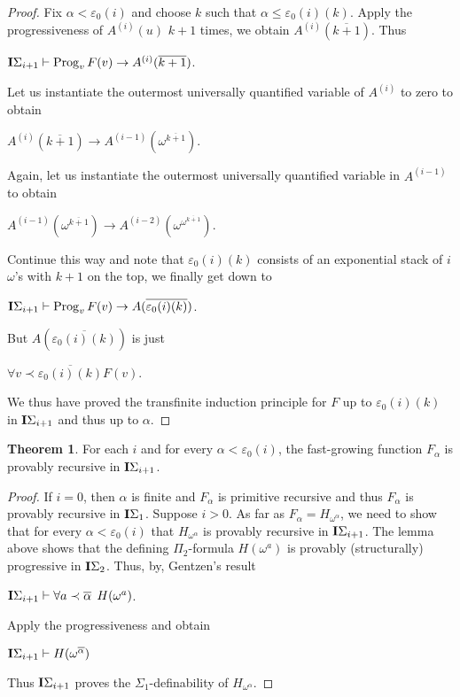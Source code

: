 \documentclass[8pt]{article}
\theoremstyle{definition}
\theoremstyle{definition}
\newtheorem{theorem}{Theorem}[section]
\theoremstyle{definition}
\theoremstyle{definition}
\theoremstyle{definition}
\theoremstyle{definition}
\theoremstyle{definition}
\theoremstyle{definition}
\theoremstyle{definition}
\theoremstyle{definition}
\theoremstyle{definition}
\theoremstyle{definition}
\theoremstyle{definition}
\theoremstyle{question}
\begin{document}
\begin{proof}
  Fix $\alpha < \varepsilon_0(i)$ and choose $k$ such that $\alpha \leq \varepsilon_0(i)(k)$. Apply the progressiveness
  of $A^{(i)}(u)$ $k + 1$ times, we obtain $A^{(i)}(\overline{k + 1})$. Thus
  \begin{center}
    ${\bf I}\Sigma_{i + 1} \vdash \operatorname{Prog}_v F(v) \to A^{(i)} (\overline{k + 1})$.
  \end{center}
  Let us instantiate the outermost universally quantified variable of $A^{(i)}$ to zero to obtain
  \begin{center}
  $A^{(i)}(\overline{k + 1}) \to A^{(i - 1)}(\omega^{\overline{ k + 1}})$.
  \end{center}
  Again, let us instantiate the outermost universally quantified variable in $A^{(i - 1)}$ to obtain
  \begin{center}
    $A^{(i - 1)}(\omega^{\overline{k + 1}}) \to A^{(i - 2)}(\omega^{\omega^{\overline{k + 1}}})$.
  \end{center}
  Continue this way and note that $\varepsilon_0(i)(k)$ consists of an exponential stack of $i$ $\omega$'s
  with $k + 1$ on the top, we finally get down to
  \begin{center}
    ${\bf I}\Sigma_{i + 1} \vdash \operatorname{Prog}_v F(v) \to A(\overline{\varepsilon_0(i)(k)})$.
  \end{center}
  But $A(\overline{\varepsilon_0(i)(k)})$ is just 
  \begin{center}
  $\forall v \prec \overline{\varepsilon_0(i)(k)} F(v)$.
  \end{center}
  We thus have proved the transfinite induction principle for $F$ up to 
  $\varepsilon_0(i)(k)$ in ${\bf I}\Sigma_{i + 1}$ and thus up to $\alpha$.
\end{proof}

\begin{theorem}
  For each $i$ and for every $\alpha < \varepsilon_0(i)$, the fast-growing function $F_{\alpha}$
  is provably recursive in ${\bf I}\Sigma_{i + 1}$.
\end{theorem}

\begin{proof}
  If $i = 0$, then $\alpha$ is finite and $F_{\alpha}$ is primitive recursive and thus
  $F_{\alpha}$ is provably recursive in ${\bf I}\Sigma_1$. Suppose $i > 0$. 
  As far as $F_{\alpha} = H_{\omega^{\alpha}}$, we need to show that for every 
  $\alpha < \varepsilon_0(i)$ that $H_{\omega^{\alpha}}$ is provably recursive in ${\bf I}\Sigma_{i + 1}$.
  The lemma above shows that the defining $\Pi_2$-formula $H(\omega^a)$ is provably (structurally) progressive
  in ${\bf I}\Sigma_2$. Thus, by, Gentzen's result
  \begin{center}
    ${\bf I}\Sigma_{i + 1} \vdash \forall a \prec \overline{\alpha} \:\: H(\omega^a)$.
  \end{center}
  Apply the progressiveness and obtain
  \begin{center}
    ${\bf I}\Sigma_{i + 1} \vdash H(\omega^{\overline{\alpha}})$
  \end{center}
  Thus ${\bf I}\Sigma_{i + 1}$ proves the $\Sigma_1$-definability of $H_{\omega^{\alpha}}$.
\end{proof}
\end{document}

